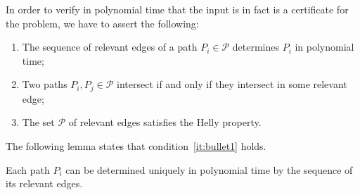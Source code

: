 \documentclass[runningheads]{llncs}
\begin{document}
In order to verify in polynomial time that the input is in fact is a certificate for the problem, we have to assert the following:

\begin{enumerate}[label=(\roman*)]
\item The sequence of relevant edges of a path $P_i\in \mathcal{P}$ determines $P_i$ in polynomial time; \label{it:bullet1}

\item Two paths $P_i, P_j \in \mathcal{P}$ intersect if and only if they intersect in some relevant edge; \label{it:bullet2}

\item The set $\mathcal{P}$ of relevant edges satisfies the Helly property.  \label{it:bullet3}
\end{enumerate}



The following lemma states that condition~\ref{it:bullet1} holds. 



\begin{lemma}\label{lem:verify1}
Each path $P_i$ can be determined uniquely in polynomial time by the sequence of its relevant edges.
\end{lemma}


\end{document}
